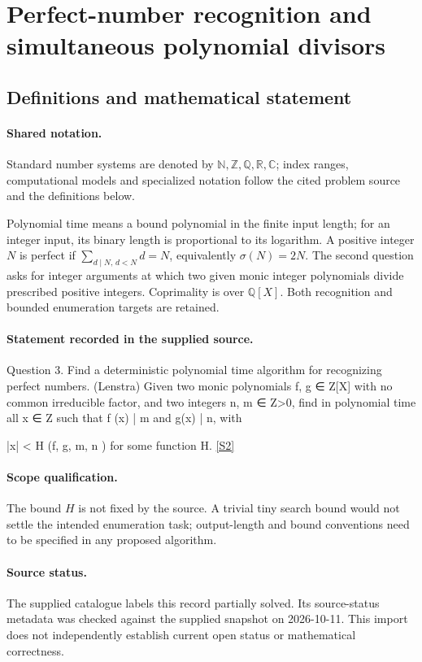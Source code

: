 \documentclass[11pt]{article}
\newcommand{\sref}[2]{\hyperlink{source:#1:#2}{[S#2]}}
\begin{document}
\section{Perfect-number recognition and simultaneous polynomial divisors}\label{statement}

\subsection{Definitions and mathematical statement}

\paragraph{Shared notation.}Standard number systems are denoted by $\mathbb N,\mathbb Z,\mathbb Q,\mathbb R,\mathbb C$; index ranges, computational models and specialized notation follow the cited problem source and the definitions below.


Polynomial time means a bound polynomial in the finite input length; for an integer input, its binary length is proportional to its logarithm. A positive integer $N$ is perfect if $\sum_{d\mid N,\,d<N}d=N$, equivalently $\sigma(N)=2N$. The second question asks for integer arguments at which two given monic integer polynomials divide prescribed positive integers. Coprimality is over $\mathbb Q[X]$. Both recognition and bounded enumeration targets are retained.
\paragraph{Statement recorded in the supplied source.}
Question 3. Find a deterministic polynomial time algorithm for recognizing perfect numbers. (Lenstra) Given two monic polynomials f, g ∈ Z[X] with no common irreducible factor, and two integers n, m ∈ Z>0, find in polynomial time all x ∈ Z such that f (x) | m and g(x) | n, with

|x| < H (f, g, m, n ) for some function H. \sref{statement}{2}
\paragraph{Scope qualification.}
The bound $H$ is not fixed by the source. A trivial tiny search bound would not settle the intended enumeration task; output-length and bound conventions need to be specified in any proposed algorithm.
\paragraph{Source status.}
The supplied catalogue labels this record partially solved. Its source-status metadata was checked against the supplied snapshot on 2026-10-11. This import does not independently establish current open status or mathematical correctness.
\end{document}
